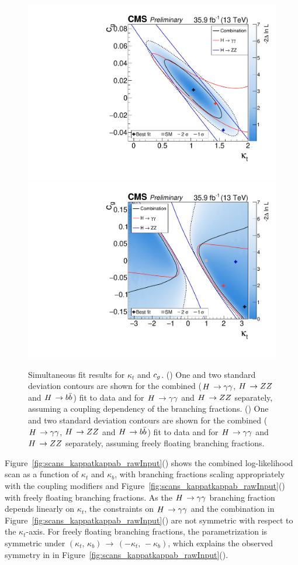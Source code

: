 \begin{figure}[hbtp]
  \begin{center}
    \includegraphics[width=0.49\linewidth]{img/resultsapproval/reworked/multicont_ktcg_couplingdependentBRs.pdf}
    \includegraphics[width=0.49\linewidth]{img/resultsapproval/reworked/multicont_ktcg_floatingBRs.pdf}
    \caption{
        Simultaneous fit results for $\kappa_t$ and $c_g$.
        (\cmsLeft)
        One and two standard deviation contours are shown for the combined ($H\,\to\gamma\gamma$, $H\,\to ZZ$ and $H\,\to b\bar{b}$) fit to data and for $H\,\to\gamma\gamma$ and $H\,\to ZZ$ separately, assuming a coupling dependency of the branching fractions.
        (\cmsRight) One and two standard deviation contours are shown for the combined ($H\,\to\gamma\gamma$, $H\,\to ZZ$ and $H\,\to b\bar{b}$) fit to data and for $H\,\to\gamma\gamma$ and $H\,\to ZZ$ separately, assuming freely floating branching fractions.
        }
    \label{fig:scans_kappatkappag_nominal}
  \end{center}
\end{figure}


Figure~\ref{fig:scans_kappatkappab_rawInput}(\cmsLeft) shows the combined log-likelihood scan as a function of $\kappa_t$ and $\kappa_b$, with branching fractions scaling appropriately with the coupling modifiers and Figure~\ref{fig:scans_kappatkappab_rawInput}(\cmsRight) with freely floating branching fractions.
% 
As the $H\,\to\gamma\gamma$ branching fraction depends linearly on $\kappa_t$, the constraints on $H\,\to\gamma\gamma$ and the combination in Figure~\ref{fig:scans_kappatkappab_rawInput}(\cmsLeft) are not symmetric with respect to the $\kappa_t$-axis.
% 
For freely floating branching fractions, the parametrization is symmetric under $(\kappa_t,\,\kappa_b) \, \to \, (-\kappa_t,\,-\kappa_b)$, which explains the observed symmetry in in Figure~\ref{fig:scans_kappatkappab_rawInput}(\cmsRight).

